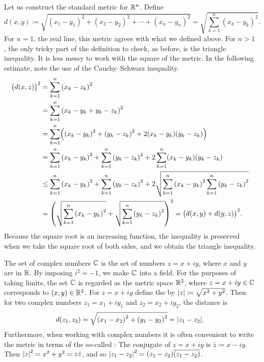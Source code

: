 \begin{example}
Let us construct the
standard metric for ${\mathbb{R}}^n$.  Define
\begin{equation*}
d(x,y) \coloneqq
\sqrt{
{(x_1-y_1)}^2 + 
{(x_2-y_2)}^2 + 
\cdots +
{(x_n-y_n)}^2
} =
\sqrt{
\sum_{k=1}^n
{(x_k-y_k)}^2 
} .
\end{equation*}
For $n=1$, the real line, this metric agrees with what we defined above.
For $n > 1$,
the only tricky part of the definition to check, as before, is the triangle inequality.
It is less messy to work with the square of the metric.  In the
following estimate, note the use of the Cauchy--Schwarz inequality.
\begin{equation*}
\begin{split}
{\bigl(d(x,z)\bigr)}^2 & =
\sum_{k=1}^n
{(x_k-z_k)}^2 
\\
& =
\sum_{k=1}^n
{(x_k-y_k+y_k-z_k)}^2 
\\
& =
\sum_{k=1}^n
\Bigl(
{(x_k-y_k)}^2+{(y_k-z_k)}^2 + 2(x_k-y_k)(y_k-z_k)
\Bigr)
\\
& =
\sum_{k=1}^n
{(x_k-y_k)}^2
+
\sum_{k=1}^n
{(y_k-z_k)}^2 
+
2
\sum_{k=1}^n
(x_k-y_k)(y_k-z_k)
\\
& \leq
\sum_{k=1}^n
{(x_k-y_k)}^2
+
\sum_{k=1}^n
{(y_k-z_k)}^2 
+
2
\sqrt{
\sum_{k=1}^n
{(x_k-y_k)}^2
\sum_{k=1}^n
{(y_k-z_k)}^2
}
\\
& =
{\left(
\sqrt{
\sum_{k=1}^n
{(x_k-y_k)}^2
}
+
\sqrt{
\sum_{k=1}^n
{(y_k-z_k)}^2 
}
\right)}^2
=
{\bigl( d(x,y) + d(y,z) \bigr)}^2 .
\end{split}
\end{equation*}
Because the square root is an increasing function, the
inequality is preserved when we 
take the square root of both sides, and we obtain the triangle inequality.
\end{example}

\begin{example}
The set of complex numbers ${\mathbb{C}}$ is the set of numbers $z = x+iy$, where $x$
and $y$ are in ${\mathbb{R}}$.  By imposing $i^2 = -1$, we make ${\mathbb{C}}$ into a
field.
For the purposes of taking limits,
the set ${\mathbb{C}}$ is regarded as the metric space ${\mathbb{R}}^2$, where $z=x+iy \in {\mathbb{C}}$
corresponds to $(x,y) \in {\mathbb{R}}^2$.
For $z=x+iy$ define the \emph{}
by $\lvert {z} \rvert \coloneqq \sqrt{x^2+y^2}$.
Then for two complex numbers
$z_1 = x_1 + iy_1$ and $z_2 = x_2 + iy_2$, the distance is
\begin{equation*}
d(z_1,z_2) = \sqrt{{(x_1-x_2)}^2+ {(y_1-y_2)}^2} = \lvert {z_1-z_2} \rvert.
\end{equation*}
Furthermore, when working with complex numbers
it is often convenient to write the metric in terms of
the so-called
\emph{}: The conjugate of $z=x+iy$
is $\bar{z} \coloneqq x-iy$.  Then 
${\lvert {z} \rvert}^2 = x^2 +y^2 = z\bar{z}$, and so ${\lvert {z_1-z_2} \rvert}^2 =
(z_1-z_2)\overline{(z_1-z_2)}$.
\end{example}

